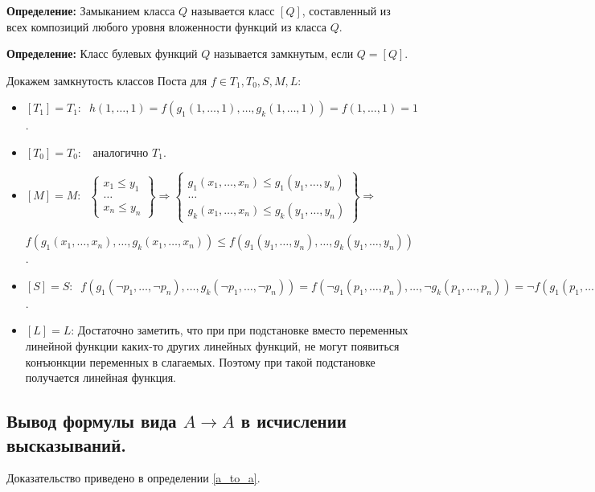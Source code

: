 \textbf{Определение:} Замыканием класса $Q$ называется класс $[Q]$, составленный из всех композиций любого уровня вложенности функций из класса $Q$.

\textbf{Определение:} Класс булевых функций $Q$ называется замкнутым, если $Q = [Q]$.
\newline \par Докажем замкнутость классов Поста для $f \in T_1, T_0, S, M, L$:
\begin{itemize}
    \item $[T_1] = T_1: \;\; h(1,\ldots,1)=f(g_1(1,\ldots,1),\ldots,g_k(1,\ldots,1))=f(1,\ldots,1)=1$.
    \item $[T_0] = T_0: \;\;$ аналогично $T_1$.
    \item $[M] = M: \;\; 
            \left\{
              \begin{array}{ccc}
                    x_1\leqslant y_1\\
                    \ldots \\
                    x_n\leqslant y_n
              \end{array}
            \right\} \Rightarrow 
            \left\{
              \begin{array}{ccc}
                    g_1(x_1,\ldots,x_n)\leqslant g_1(y_1,\ldots,y_n)\\
                    \ldots \\
                    g_k(x_1,\ldots,x_n)\leqslant g_k(y_1,\ldots,y_n)
              \end{array}
            \right\} \Rightarrow$
            
            $f(g_1(x_1,\ldots,x_n),\ldots,g_k(x_1,\ldots,x_n)) \leqslant f(g_1(y_1,\ldots,y_n),\ldots,g_k(y_1,\ldots,y_n)) $.
    \item $[S] = S: \;\; f(g_1(\neg p_1,\ldots,\neg p_n),\ldots,g_k(\neg p_1,\ldots,\neg p_n)) = f(\neg g_1(p_1,\ldots,p_n),\ldots,\neg g_k(p_1,\ldots,p_n)) = \neg f(g_1(p_1,\ldots,p_n),\ldots,g_k(p_1,\ldots,p_n))$.
    \item $[L] = L$: \;\; Достаточно заметить, что при при подстановке вместо переменных линейной функции каких-то других линейных функций, не могут появиться конъюнкции переменных в слагаемых. Поэтому при такой подстановке получается линейная функция.
\end{itemize}

\subsection{Вывод формулы вида $A \to A$ в исчислении высказываний.}
Доказательство приведено в определении \ref{a_to_a}.

